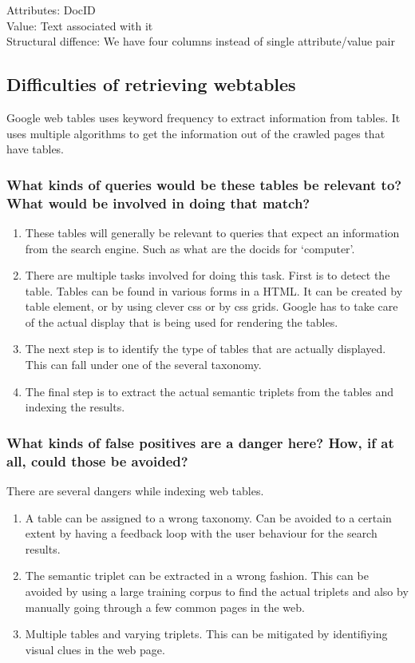 \documentclass{article}
\begin{document}
\begin{description}
    Attributes: DocID\\
    Value: Text associated with it\\
    Structural diffence:  We have four columns instead of single attribute/value pair
\end{description}

\subsection{Difficulties of retrieving webtables}
Google web tables uses keyword frequency to extract information from tables.  It uses multiple algorithms to get the information out of the crawled pages that have tables.
\subsubsection{What kinds of queries would be these tables be relevant to? What would be involved in doing that match?}
\begin{enumerate}
  \item  These tables will generally be relevant to queries that expect an information from the search engine.  Such as what are the docids for `computer'.
  \item There are multiple tasks involved for doing this task.  First is to detect the table.  Tables can be found in various forms in a HTML\@.  It can be created by table element, or by using clever css  or by css grids.  Google has to take care of the actual display that is being used for rendering the tables.
  \item The next step is to identify the type of tables that are actually displayed.  This can fall under one of the several taxonomy.
  \item The final step is to extract the actual semantic triplets from the tables and indexing the results.
\end{enumerate}

\subsubsection{What kinds of false positives are a danger here? How, if at all, could those be avoided?}
There are several dangers while indexing web tables.
\begin{enumerate}
  \item A table can be assigned to a wrong taxonomy.  Can be avoided to a certain extent by having a feedback loop with the user behaviour for the search results.
  \item The semantic triplet can be extracted in a wrong fashion.  This can be avoided by using a large training corpus to find the actual triplets and also by manually going through a few common pages in the web.
  \item Multiple tables and varying triplets.  This can be mitigated by identifiying visual clues in the web page.
\end{enumerate}
\end{document}
